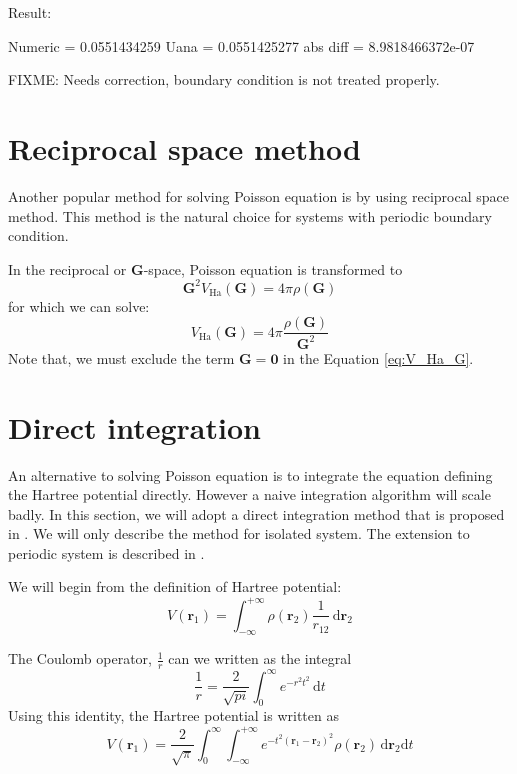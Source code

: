 Result:
\begin{textcode}
Numeric  =       0.0551434259
Uana     =       0.0551425277
abs diff =   8.9818466372e-07
\end{textcode}

FIXME: Needs correction, boundary condition is not treated properly.

\section{Reciprocal space method}

Another popular method for solving Poisson equation is by using
reciprocal space method.
This method is the natural choice for systems with periodic boundary condition.

In the reciprocal or $\mathbf{G}$-space, Poisson equation is transformed to
\begin{equation}
\mathbf{G}^{2} V_{\mathrm{Ha}}(\mathbf{G}) = 4\pi\rho(\mathbf{G})
\end{equation}
for which we can solve:
\begin{equation}
V_{\mathrm{Ha}}(\mathbf{G}) = 4\pi \frac{\rho(\mathbf{G})}{\mathbf{G}^{2}}
\label{eq:V_Ha_G}
\end{equation}
Note that, we must exclude the term $\mathbf{G}=\mathbf{0}$ in the Equation
\ref{eq:V_Ha_G}.


\section{Direct integration}

An alternative to solving Poisson equation is to integrate the equation defining
the Hartree potential directly. However a naive integration algorithm will scale
badly. In this section, we will adopt a direct integration method that is proposed
in \cite{Sundholm2005}. We will only describe the method for isolated system.
The extension to periodic system is described in \cite{Losilla2010}.

We will begin from the definition of Hartree potential:
\begin{equation}
V(\mathbf{r}_{1}) = \int_{-\infty}^{+\infty}
\rho(\mathbf{r}_{2}) \frac{1}{r_{12}} \, \mathrm{d}\mathbf{r}_{2}
\end{equation}

The Coulomb operator, $\frac{1}{r}$ can we written as the integral
\begin{equation}
\frac{1}{r} = \frac{2}{\sqrt{pi}} \int_{0}^{\infty} e^{-r^2 t^2}\,\mathrm{d}t
\end{equation}
Using this identity, the Hartree potential is written as
\begin{equation}
V(\mathbf{r}_{1}) = \frac{2}{\sqrt{\pi}}
\int_{0}^{\infty}
\int_{-\infty}^{+\infty}
e^{-t^2(\mathbf{r}_1 - \mathbf{r}_2)^2} \rho(\mathbf{r}_2)
\, \mathrm{d}\mathbf{r}_{2}\mathrm{d}t
\end{equation}

